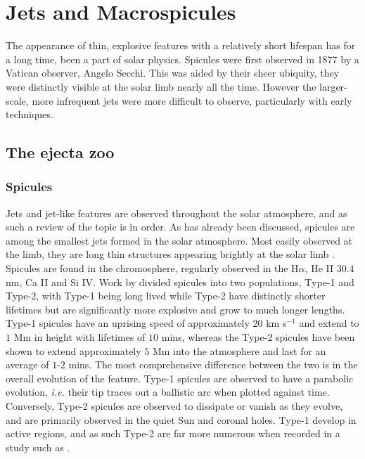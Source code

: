 


\label{ch:Chap2}
\chapter{Jets and Macrospicules}



The appearance of thin, explosive features with a relatively short lifespan has for a long time, been a part of solar physics.
Spicules were first observed in 1877 by a Vatican observer, Angelo Secchi.
This was aided by their sheer ubiquity, they were distinctly visible at the solar limb nearly all the time.
However the larger-scale, more infrequent jets were more difficult to observe, particularly with early techniques.

\section{The ejecta zoo}


\subsection{Spicules}
Jets and jet-like features are observed throughout the solar atmosphere, and as such a review of the topic is in order.
As has already been discussed, spicules are among the smallest jets formed in the solar atmosphere. 
Most easily observed at the limb, they are long thin structures appearing brightly at the solar limb \cite{Beckers1972}.
Spicules are found in the chromosphere, regularly observed in the H$\alpha$, He II $30.4$ nm, Ca II and Si IV.
Work by \cite{DePontieu2007} divided spicules into two populations, Type-1 and Type-2, with Type-1 being long lived while Type-2 have distinctly shorter lifetimes but are significantly more explosive and grow to much longer lengths.
Type-1 spicules have an uprising speed of approximately $20$ km s$^{-1}$ and extend to $1$ Mm in height with lifetimes of $10$ mins, whereas the Type-2 spicules have been shown to extend approximately $5$ Mm into the atmosphere and last for an average of $1$-$2$ mins. 
The most comprehensive difference between the two is in the overall evolution of the feature.
Type-1 spicules are observed to have a parabolic evolution, \emph{i.e.} their tip traces out a ballistic arc when plotted against time.
Conversely, Type-2 spicules are observed to dissipate or vanish as they evolve, and are primarily observed in the quiet Sun and coronal holes.
Type-1 develop in active regions, and as such Type-2 are far more numerous when recorded in a study such as \cite{Pereira2012}.

